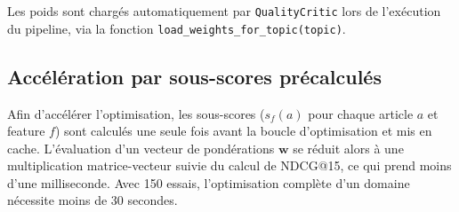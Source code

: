Les poids sont chargés automatiquement par \texttt{QualityCritic}
lors de l'exécution du pipeline, via la fonction
\texttt{load\_weights\_for\_topic(topic)}.

\subsection{Accélération par sous-scores précalculés}

Afin d'accélérer l'optimisation, les sous-scores ($s_f(a)$ pour chaque
article $a$ et feature $f$) sont calculés une seule fois avant la boucle
d'optimisation et mis en cache. L'évaluation d'un vecteur de pondérations
$\mathbf{w}$ se réduit alors à une multiplication matrice-vecteur suivie
du calcul de NDCG@15, ce qui prend moins d'une milliseconde. Avec 150
essais, l'optimisation complète d'un domaine nécessite moins de 30 secondes.
